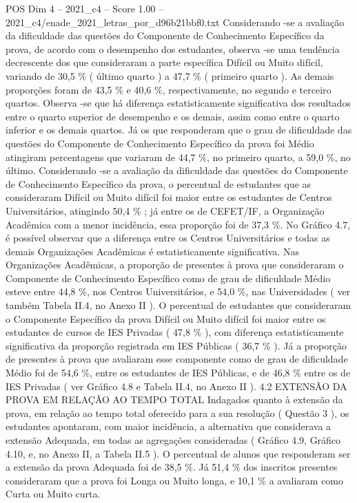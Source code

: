 \begin{textsample}{POS Dim 4 – 2021\_c4 – Score 1.00 – 2021\_c4/enade\_2021\_letras\_por\_d96b21bbf0.txt}
Considerando -se a avaliação da dificuldade das questões do Componente de Conhecimento Específico da prova, de acordo com o desempenho dos estudantes, observa -se uma tendência decrescente dos que consideraram a parte específica Difícil ou Muito difícil, variando de 30,5 \% ( último quarto ) a 47,7 \% ( primeiro quarto ).
As demais proporções foram de 43,5 \% e 40,6 \%, respectivamente, no segundo e terceiro quartos.
Observa -se que há diferença estatisticamente significativa dos resultados entre o quarto superior de desempenho e os demais, assim como entre o quarto inferior e os demais quartos.
Já os que responderam que o grau de dificuldade das questões do Componente de Conhecimento Específico da prova foi Médio atingiram percentagens que variaram de 44,7 \%, no primeiro quarto, a 59,0 \%, no último.
Considerando -se a avaliação da dificuldade das questões do Componente de Conhecimento Específico da prova, o percentual de estudantes que as consideraram Difícil ou Muito difícil foi maior entre os estudantes de Centros Universitários, atingindo 50,4 \% ; já entre os de CEFET/IF, a Organização Acadêmica com a menor incidência, essa proporção foi de 37,3 \%.
No Gráfico 4.7, é possível observar que a diferença entre os Centros Universitários e todas as demais Organizações Acadêmicas é estatisticamente significativa.
Nas Organizações Acadêmicas, a proporção de presentes à prova que consideraram o Componente de Conhecimento Específico como de grau de dificuldade Médio esteve entre 44,8 \%, nos Centros Universitários, e 54,0 \%, nas Universidades ( ver também Tabela II.4, no Anexo II ).
O percentual de estudantes que consideraram o Componente Específico da prova Difícil ou Muito difícil foi maior entre os estudantes de cursos de IES Privadas ( 47,8 \% ), com diferença estatisticamente significativa da proporção registrada em IES Públicas ( 36,7 \% ).
Já a proporção de presentes à prova que avaliaram esse componente como de grau de dificuldade Médio foi de 54,6 \%, entre os estudantes de IES Públicas, e de 46,8 \% entre os de IES Privadas ( ver Gráfico 4.8 e Tabela II.4, no Anexo II ). 4.2 EXTENSÃO DA PROVA EM RELAÇÃO AO TEMPO TOTAL Indagados quanto à extensão da prova, em relação ao tempo total oferecido para a sua resolução ( Questão 3 ), os estudantes apontaram, com maior incidência, a alternativa que considerava a extensão Adequada, em todas as agregações consideradas ( Gráfico 4.9, Gráfico 4.10, e, no Anexo II, a Tabela II.5 ).
O percentual de alunos que responderam ser a extensão da prova Adequada foi de 38,5 \%.
Já 51,4 \% dos inscritos presentes consideraram que a prova foi Longa ou Muito longa, e 10,1 \% a avaliaram como Curta ou Muito curta.

\end{textsample}
